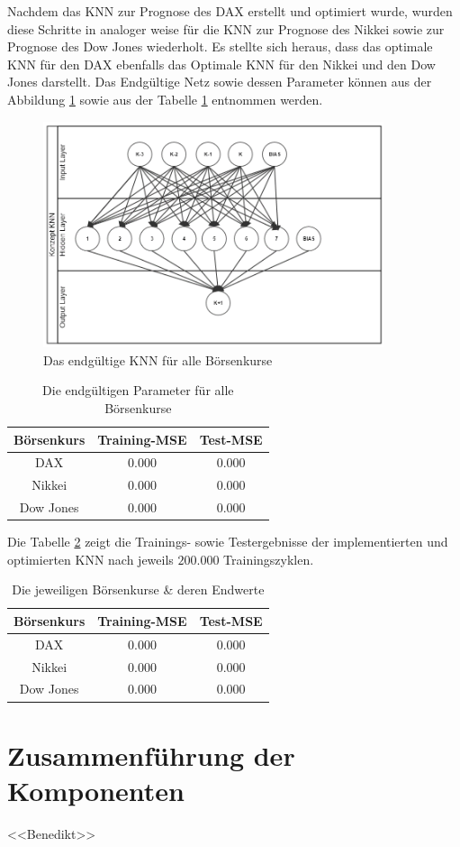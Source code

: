 Nachdem das KNN zur Prognose des DAX erstellt und optimiert wurde, wurden diese Schritte in analoger weise für die KNN zur Prognose des Nikkei sowie zur Prognose des Dow Jones wiederholt.
Es stellte sich heraus, dass das optimale KNN für den DAX ebenfalls das Optimale KNN für den Nikkei und den Dow Jones darstellt. Das Endgültige Netz sowie dessen Parameter können aus der Abbildung \ref{fig:ENDKNN} sowie aus der Tabelle \ref{tab:ENDconf} entnommen werden.

\begin{figure}[H]
	\centering
	\includegraphics[width=10cm]{FertigKNN.PNG}
	\caption{Das endgültige KNN für alle Börsenkurse}
	\label{fig:ENDKNN}
\end{figure}

\begin{table}[H]
  \centering
  \begin{tabular}{|c|c|c|}
  \hline 
  \rule[0ex]{0pt}{2.5ex}  Börsenkurs & Training-MSE & Test-MSE\\ 
  \hline 
  \rule[0ex]{0pt}{2.5ex} DAX & 0.000 & 0.000  \\ 
  \hline 
  \rule[0ex]{0pt}{2.5ex} Nikkei & 0.000 & 0.000  \\ 
  \hline 
   \rule[0ex]{0pt}{2.5ex} Dow Jones & 0.000 & 0.000  \\ 
  \hline 
  \end{tabular} 
  \caption{Die endgültigen Parameter für alle Börsenkurse}
  \label{tab:ENDconf}
\end{table}

Die Tabelle \ref{tab:ENDval} zeigt die Trainings- sowie Testergebnisse der implementierten und optimierten KNN nach jeweils $200.000$ Trainingszyklen.

\begin{table}[H]
  \centering
  \begin{tabular}{|c|c|c|}
  \hline 
  \rule[0ex]{0pt}{2.5ex}  Börsenkurs & Training-MSE & Test-MSE\\ 
  \hline 
  \rule[0ex]{0pt}{2.5ex} DAX & 0.000 & 0.000  \\ 
  \hline 
  \rule[0ex]{0pt}{2.5ex} Nikkei & 0.000 & 0.000  \\ 
  \hline 
   \rule[0ex]{0pt}{2.5ex} Dow Jones & 0.000 & 0.000  \\ 
  \hline 
  \end{tabular} 
  \caption{Die jeweiligen Börsenkurse \& deren Endwerte}
  \label{tab:ENDval}
\end{table}

\section{Zusammenführung der Komponenten}
\label{section:Zusammenführung der Komponenten}
<<Benedikt>> \Blindtext

